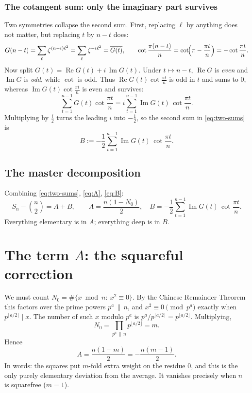\documentclass[11pt]{article}
\DeclareMathOperator{\Imag}{Im}
\DeclareMathOperator{\Real}{Re}
\begin{document}
\subsubsection*{The cotangent sum: only the imaginary part survives}
Two symmetries collapse the second sum. First, replacing $\ell$ by anything does not matter, but replacing
$t$ by $n-t$ does:
\[
G(n-t)=\sum_{\ell}\zeta^{(n-t)\ell^2}=\sum_\ell\zeta^{-t\ell^2}=\overline{G(t)},\qquad
\cot\frac{\pi(n-t)}{n}=\cot\!\Bigl(\pi-\frac{\pi t}{n}\Bigr)=-\cot\frac{\pi t}{n}.
\]
Now split $G(t)=\Real G(t)+i\,\Imag G(t)$. Under $t\mapsto n-t$, $\Real G$ is \emph{even} and $\Imag G$ is
\emph{odd}, while $\cot$ is odd. Thus $\Real G(t)\cot\frac{\pi t}{n}$ is odd in $t$ and sums to $0$, whereas
$\Imag G(t)\cot\frac{\pi t}{n}$ is even and survives:
\[
\sum_{t=1}^{n-1}G(t)\cot\frac{\pi t}{n}=i\sum_{t=1}^{n-1}\Imag G(t)\,\cot\frac{\pi t}{n}.
\]
Multiplying by $\tfrac i2$ turns the leading $i$ into $-\tfrac12$, so the second sum in \eqref{eq:two-sums} is
\begin{equation}\label{eq:B}
B:=-\frac12\sum_{t=1}^{n-1}\Imag G(t)\,\cot\frac{\pi t}{n}.
\end{equation}

\subsection{The master decomposition}
Combining \eqref{eq:two-sums}, \eqref{eq:A}, \eqref{eq:B}:
\begin{equation}\label{eq:master}
\boxed{\;S_n-\binom n2=A+B,\qquad A=\frac{n(1-N_0)}{2},\quad B=-\frac12\sum_{t=1}^{n-1}\Imag G(t)\,\cot\frac{\pi t}{n}.\;}
\end{equation}
Everything elementary is in $A$; everything deep is in $B$.

\section{The term $A$: the squareful correction}

We must count $N_0=\#\{x\bmod n:\ x^2\equiv0\}$. By the Chinese Remainder Theorem this factors over the prime
powers $p^a\,\|\,n$, and $x^2\equiv0\pmod{p^a}$ exactly when $p^{\lceil a/2\rceil}\mid x$. The number of such $x$
modulo $p^a$ is $p^{a}/p^{\lceil a/2\rceil}=p^{\lfloor a/2\rfloor}$. Multiplying,
\[
N_0=\prod_{p^a\,\|\,n}p^{\lfloor a/2\rfloor}=m.
\]
Hence
\begin{equation}\label{eq:Aval}
A=\frac{n(1-m)}{2}=-\frac{n(m-1)}{2}.
\end{equation}
In words: the squares put $m$-fold extra weight on the residue $0$, and this is the only purely elementary
deviation from the average. It vanishes precisely when $n$ is squarefree ($m=1$).
\end{document}
